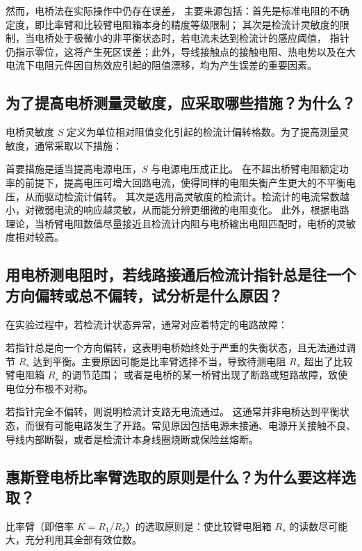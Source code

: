 \documentclass{../../templates/Report}%
\begin{document}
\begin{fullreportonly}
    然而，电桥法在实际操作中仍存在误差，
    主要来源包括：首先是标准电阻的不确定度，即比率臂和比较臂电阻箱本身的精度等级限制；
    其次是检流计灵敏度的限制，当电桥处于极微小的非平衡状态时，若电流未达到检流计的感应阈值，
    指针仍指示零位，这将产生死区误差；此外，导线接触点的接触电阻、热电势以及在大电流下电阻元件因自热效应引起的阻值漂移，均为产生误差的重要因素。

    \subsection{为了提高电桥测量灵敏度，应采取哪些措施？为什么？}

    电桥灵敏度 $S$ 定义为单位相对阻值变化引起的检流计偏转格数。为了提高测量灵敏度，通常采取以下措施：

    首要措施是适当提高电源电压，$S$ 与电源电压成正比。
    在不超出桥臂电阻额定功率的前提下，提高电压可增大回路电流，使得同样的电阻失衡产生更大的不平衡电压，从而驱动检流计偏转。
    其次是选用高灵敏度的检流计。检流计的电流常数越小，对微弱电流的响应越灵敏，从而能分辨更细微的电阻变化。
    此外，根据电路理论，当桥臂电阻数值尽量接近且检流计内阻与电桥输出电阻匹配时，电桥的灵敏度相对较高。

    \subsection{用电桥测电阻时，若线路接通后检流计指针总是往一个方向偏转或总不偏转，试分析是什么原因？}

    在实验过程中，若检流计状态异常，通常对应着特定的电路故障：

    若指针总是向一个方向偏转，这表明电桥始终处于严重的失衡状态，且无法通过调节 $R_s$ 达到平衡。主要原因可能是比率臂选择不当，导致待测电阻 $R_x$ 超出了比较臂电阻箱 $R_s$ 的调节范围；
    或者是电桥的某一桥臂出现了断路或短路故障，致使电位分布极不对称。

    若指针完全不偏转，则说明检流计支路无电流通过。
    这通常并非电桥达到平衡状态，而很有可能电路发生了开路。常见原因包括电源未接通、电源开关接触不良、导线内部断裂，或者是检流计本身线圈烧断或保险丝熔断。

    \subsection{惠斯登电桥比率臂选取的原则是什么？为什么要这样选取？}

    比率臂（即倍率 $K = R_1 / R_2$）的选取原则是：使比较臂电阻箱 $R_s$ 的读数尽可能大，充分利用其全部有效位数。


\end{fullreportonly}
\end{document}
